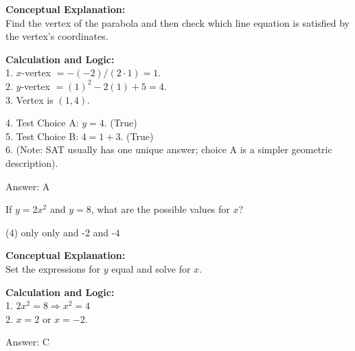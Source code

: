 \documentclass[11pt,paper=a4,answers]{exam}
\begin{document}
\begin{questions}
\begin{solution}
\textbf{Conceptual Explanation:} \\
Find the vertex of the parabola and then check which line equation is satisfied by the vertex's coordinates.

\vspace{20pt}

\textbf{Calculation and Logic:} \\
1. $x$-vertex $= -(-2)/(2 \cdot 1) = 1$. \\
2. $y$-vertex $= (1)^2 - 2(1) + 5 = 4$. \\
3. Vertex is $(1, 4)$.

\vspace{10pt}

4. Test Choice A: $y = 4$. (True) \\
5. Test Choice B: $4 = 1 + 3$. (True) \\
6. (Note: SAT usually has one unique answer; choice A is a simpler geometric description).

\vspace{25pt}

Answer: \colorbox{yellow!100}{A}
\end{solution}

\vspace{40pt}

\question
If $y = 2x^2$ and $y = 8$, what are the possible values for $x$?
\begin{tasks}(4)
     only
     only
     and -2
     and -4
\end{tasks}

\begin{solution}
\textbf{Conceptual Explanation:} \\
Set the expressions for $y$ equal and solve for $x$.

\vspace{20pt}

\textbf{Calculation and Logic:} \\
1. $2x^2 = 8 \Rightarrow x^2 = 4$ \\
2. $x = 2$ or $x = -2$.

\vspace{25pt}

Answer: \colorbox{yellow!100}{C}
\end{solution}

\vspace{40pt}


\end{questions}
\end{document}
